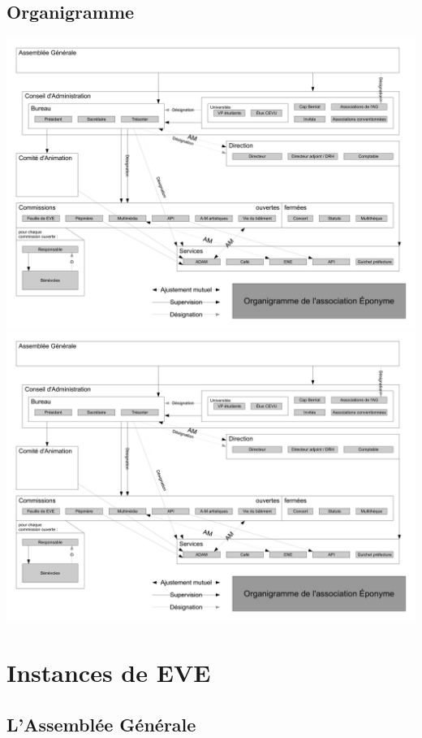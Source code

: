 \subsection{Organigramme}
\label{organigramme}
\newpage
\includegraphics[trim=0mm 0mm 210mm 0mm,clip,scale=0.8]{annexes/organigramme.pdf}
\newpage
\includegraphics[trim=210mm 0mm 0mm 0mm,clip,scale=0.8]{annexes/organigramme.pdf}
\newpage

\section{Instances de EVE}

\label{parcoursstruct}

\subsection{L'Assemblée Générale}

